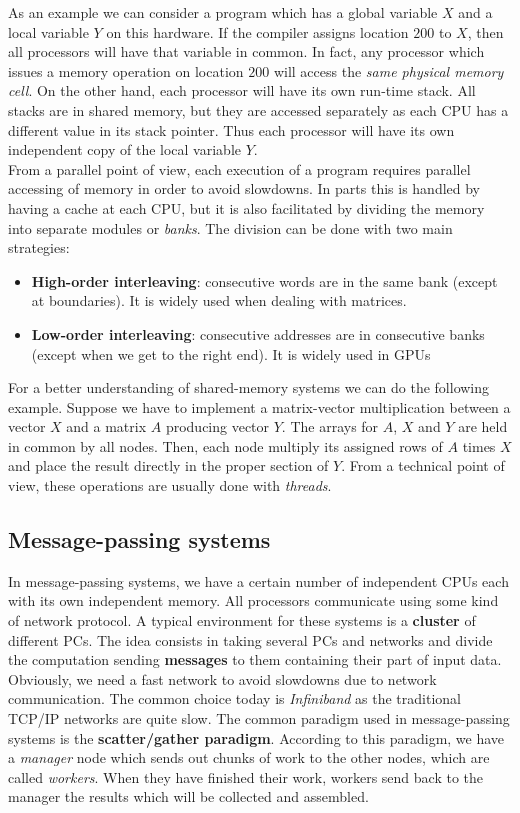 As an example we can consider a program which has a global variable $X$ and a local variable $Y$ on this hardware. If the compiler assigns location $200$ to $X$, then all processors will have that variable in common. In fact, any processor which issues a memory operation on location $200$ will access the \textit{same physical memory cell}. On the other hand, each processor will have its own run-time stack. All stacks are in shared memory, but they are accessed separately as each CPU has a different value in its stack pointer. Thus each processor will have its own independent copy of the local variable $Y$.\\

From a parallel point of view, each execution of a program requires parallel accessing of memory in order to avoid slowdowns. In parts this is handled by having a cache at each CPU, but it is also facilitated by dividing the memory into separate modules or \textit{banks}. The division can be done with two main strategies:
\begin{itemize}
 \item \textbf{High-order interleaving}: consecutive words are in the same bank (except at boundaries). It is widely used when dealing with matrices.
 \item \textbf{Low-order interleaving}: consecutive addresses are in consecutive banks (except when we get to the right end). It is widely used in GPUs
\end{itemize}

For a better understanding of shared-memory systems we can do the following example. Suppose we have to implement a matrix-vector multiplication between a vector $X$ and a matrix $A$ producing vector $Y$. The arrays for $A$, $X$ and $Y$ are held in common by all nodes. Then, each node multiply its assigned rows of $A$ times $X$ and place the result directly in the proper section of $Y$. From a technical point of view, these operations are usually done with \textit{threads}.

\subsection{Message-passing systems}

In message-passing systems, we have a certain number of independent CPUs each with its own independent memory. All processors communicate using some kind of network protocol. A typical environment for these systems is a \textbf{cluster} of different PCs. The idea consists in taking several PCs and networks and divide the computation sending \textbf{messages} to them containing their part of input data. Obviously, we need a fast network to avoid slowdowns due to network communication. The common choice today is \textit{Infiniband} as the traditional TCP/IP networks are quite slow. The common paradigm used in message-passing systems is the \textbf{scatter/gather paradigm}. According to this paradigm, we have a \textit{manager} node which sends out chunks of work to the other nodes, which are called \textit{workers}. When they have finished their work, workers send back to the manager the results which will be collected and assembled.\\

